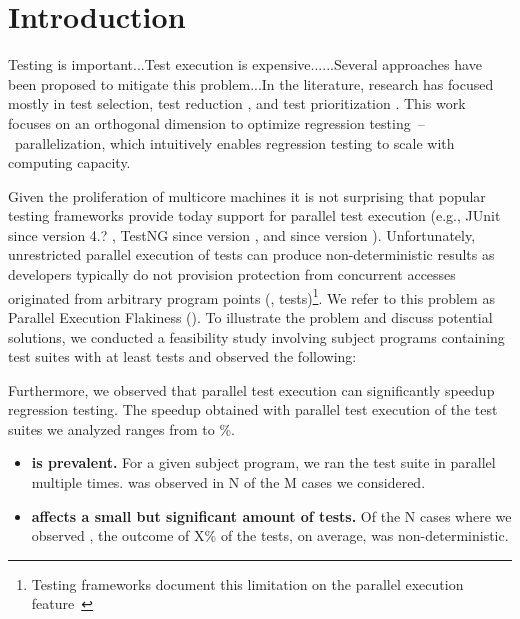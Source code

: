 \section{Introduction}

\sloppy Testing is important...Test execution is
expensive......Several approaches have been proposed to
mitigate this problem...In the literature, research has focused mostly
in test selection, test reduction , and test
prioritization .  This work focuses on an orthogonal
dimension to optimize regression testing~--~parallelization, which
intuitively enables regression testing to scale with computing
capacity.

Given the proliferation of multicore machines it is not surprising
that popular testing frameworks provide today support for parallel
test execution (e.g., JUnit since version 4.?  , TestNG
since version , and  since version 
).  Unfortunately, unrestricted parallel execution of tests
can produce non-deterministic results as developers typically do not
provision protection from concurrent accesses originated from
arbitrary program points (\ie{}, tests)\footnote{Testing frameworks
  document this limitation on the parallel execution
  feature~}.  We refer to this problem as Parallel Execution
Flakiness (\pef{}).  To illustrate the \pef{} problem and discuss
potential solutions, we conducted a feasibility study involving
 subject programs containing test suites with at least
 tests and observed the following:

Furthermore, we observed that parallel test execution can
significantly speedup regression testing.  The speedup obtained with
parallel test execution of the test suites we analyzed ranges from
 to \%.  


\begin{itemize}
\item \textbf{\pef{} is prevalent.} For a given subject program, we ran
  the test suite in parallel multiple times.  \pef{} was observed in N of
  the M cases we considered.
\item \textbf{\pef{} affects a small but significant amount of tests.}
  Of the N cases where we observed \pef{}, the outcome of X\% of the
  tests, on average, was non-deterministic.
\end{itemize}

